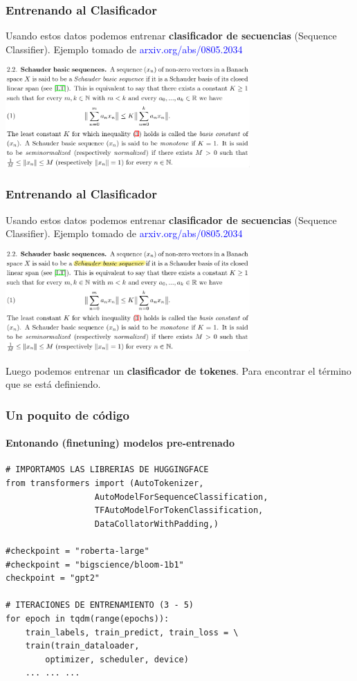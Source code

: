 \documentclass[10pt]{beamer}
\begin{document}
\begin{frame}[fragile]
\begin{itemize}
\end{itemize}
\end{frame}


\begin{frame}
    \frametitle{Entrenando al Clasificador}
    Usando estos datos podemos entrenar \textbf{clasificador de secuencias} (Sequence Classifier). \pause Ejemplo tomado de \textcolor{blue}{arxiv.org/abs/0805.2034}
    \begin{center}
        \includegraphics[width=0.7\textwidth]{../Images/def2.png}
    \end{center}
\end{frame}

\begin{frame}
    \frametitle{Entrenando al Clasificador}
    Usando estos datos podemos entrenar \textbf{clasificador de secuencias} (Sequence Classifier). Ejemplo tomado de \textcolor{blue}{arxiv.org/abs/0805.2034}
    \begin{center}
        \includegraphics[width=0.7\textwidth]{../Images/def_highlighted.png}
    \end{center}
    Luego podemos entrenar un \textbf{clasificador de tokenes}. Para encontrar el término que se está definiendo.
\end{frame}

\begin{frame}[containsverbatim]
    \frametitle{Un poquito de código}
    \framesubtitle{Entonando (finetuning) modelos pre-entrenado}
    \begin{verbatim}
# IMPORTAMOS LAS LIBRERIAS DE HUGGINGFACE
from transformers import (AutoTokenizer,
                  AutoModelForSequenceClassification,
                  TFAutoModelForTokenClassification,
                  DataCollatorWithPadding,)

#checkpoint = "roberta-large"
#checkpoint = "bigscience/bloom-1b1"
checkpoint = "gpt2"

# ITERACIONES DE ENTRENAMIENTO (3 - 5)
for epoch in tqdm(range(epochs)):
    train_labels, train_predict, train_loss = \
    train(train_dataloader,
        optimizer, scheduler, device)
    ... ... ...
    \end{verbatim}
\end{frame}
\end{document}
